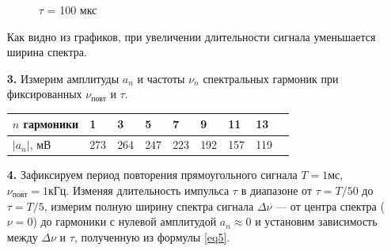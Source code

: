 \documentclass[a4paper,12pt]{article} %
\begin{document}
\begin{enumerate}
\begin{figure}[h]
\begin{minipage}[h]{0.47\linewidth}
 $\tau$ = 100 мкс \\ 
\end{minipage}
\caption{}
\label{ris:experimentalcorrelationsignals}
\end{figure}

\newpage
Как видно из графиков, при увеличении длительности сигнала уменьшается ширина спектра.

\item [\textbf{3.}] Измерим амплитуды $a_n$ и частоты $\nu_n$ спектральных гармоник при фиксированных $\nu_\text{повт}$ и $\tau$.

\begin{table}[h]
\centering
\begin{tabular}{|l|l|l|l|l|l|l|l|l|}
\hline
$n$ гармоники& 1 & 3 & 5 & 7 & 9 & 11 & 13\\ \hline
$|a_n|$, мВ &273& 264 &  247& 223 & 192 & 157 & 119\\ \hline
\end{tabular}
\end{table}


\item[\textbf{4.}] Зафиксируем период повторения прямоугольного сигнала $T = 1 \text{мс}$, $\nu_\text{повт} = 1\text{кГц}$. Изменяя длительность импульса $\tau$ в диапазоне от 
$\tau=T/50$ до $\tau=T/5$, измерим полную ширину спектра сигнала $\Delta \nu$ — от центра спектра ($\nu = 0$) до гармоники с нулевой амплитудой $a_n \approx 0$ и установим зависимость между $\Delta \nu$ и $\tau$, полученную из формулы \ref{eq5}.


\end{enumerate}
\end{document}
